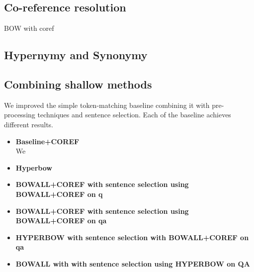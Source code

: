 \documentclass[11pt]{article}
\begin{document}

        \subsection{Co-reference resolution}
        

        \begin{table}[!th]
        \centering
        
        \caption{\label{table:resultBOWcoref}BOW with coref}
        \end{table}

        \subsection{Hypernymy and Synonymy}
        



\subsection{Combining shallow methods}
\label{sec:combined}

We improved the simple token-matching baseline combining it with pre-processing techniques and sentence selection. Each of the baseline achieves different results. 

\begin{itemize}
\item \textbf{Baseline+COREF} \\
We
\item \textbf{Hyperbow}
\item \textbf{BOWALL+COREF with sentence selection using BOWALL+COREF on q}
\item \textbf{BOWALL+COREF with sentence selection using BOWALL+COREF on qa}
\item \textbf{HYPERBOW with sentence selection with BOWALL+COREF on qa}
\item \textbf{BOWALL with  with sentence selection using HYPERBOW on QA}
\end{itemize}
\end{document}
